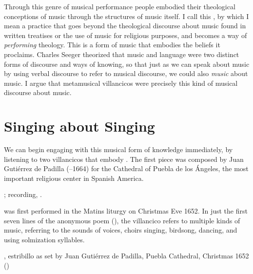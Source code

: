 Through this genre of musical performance people embodied their theological
conceptions of music through the structures of music itself.
I call this , by which I mean a practice that goes
beyond the theological discourse about music found in written treatises or the
use of music for religious purposes, and becomes a way of \emph{performing}
theology.
This is a form of music that embodies the beliefs it proclaims.
Charles Seeger theorized that music and language were two distinct forms of
discourse and ways of knowing, so that just as we can speak about music by
using verbal discourse to refer to musical discourse, we could also
\emph{music} about music.%
    \Autocites
    {Seeger:Unitary}
    {Small:Musicking}
I argue that metamusical villancicos were precisely this kind of musical
discourse about music.


\section{Singing about Singing}

We can begin engaging with this musical form of knowledge immediately, by
listening to two villancicos that embody .%
    \Autocites
    {Murata:Singing}
The first piece was composed by Juan Gutiérrez de Padilla (--1664)
for the Cathedral of Puebla de los Ángeles, the most important religious center
in Spanish America.%
\begin{Footnote}
    ; 
    recording, \autocite{Padilla:1652ChristmasCD}.
\end{Footnote}
 was first performed in the Matins liturgy
on Christmas Eve 1652.  
In just the first seven lines of the anonymous poem
(), the villancico refers
to multiple kinds of music, referring to the sounds of voices, choirs singing,
birdsong, dancing, and using solmization syllables.


{, estribillo as set by Juan Gutiérrez
de Padilla, Puebla Cathedral, Christmas 1652 
()}

